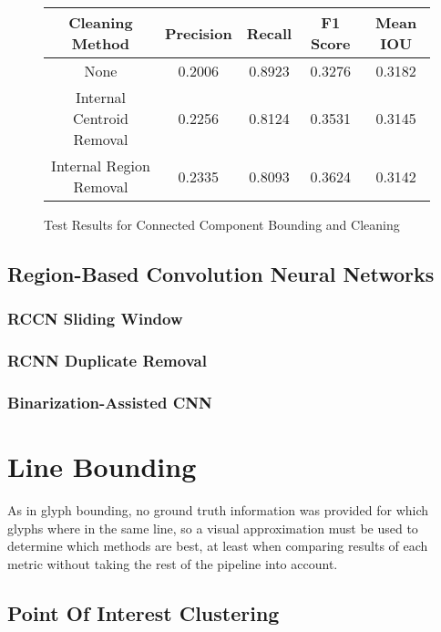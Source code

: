 \begin{figure}[H]
    \caption{Test Results for Connected Component Bounding and Cleaning}
    \label{fig:ccBoundingEval}
    \centering
    \begin{tabular}{ | c | c | c | c | c | }
        \hline
        Cleaning Method & Precision & Recall & F1 Score & Mean IOU \\
        \hline
        None & 0.2006 & 0.8923 & 0.3276 & 0.3182 \\
        Internal Centroid Removal & 0.2256 & 0.8124 & 0.3531 & 0.3145 \\
        Internal Region Removal & 0.2335 & 0.8093 & 0.3624 & 0.3142 \\
        \hline
    \end{tabular}
\end{figure}

\subsection{Region-Based Convolution Neural Networks}

\subsubsection{RCCN Sliding Window}

\subsubsection{RCNN Duplicate Removal}

\subsubsection{Binarization-Assisted CNN}

\section{Line Bounding}

As in glyph bounding, no ground truth information was provided for which glyphs where in the same line, so a visual approximation must be used to determine which methods are best, at least when comparing results of each metric without taking the rest of the pipeline into account.

\subsection{Point Of Interest Clustering}

